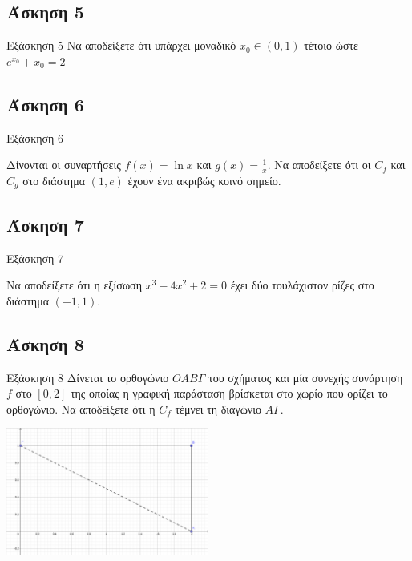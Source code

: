 \documentclass[greek]{beamer}
\begin{document}
\subsection{Άσκηση 5}
\begin{frame}[label=Άσκηση5]{Εξάσκηση 5}
    Να αποδείξετε ότι υπάρχει μοναδικό $x_0\in (0,1)$ τέτοιο ώστε $e^{x_0}+x_0=2$

\end{frame}

\subsection{Άσκηση 6}
\begin{frame}[label=Άσκηση6]{Εξάσκηση 6}

    Δίνονται οι συναρτήσεις $f(x)=\ln x$ και $g(x)=\frac{1}{x}$. Να αποδείξετε ότι οι $C_f$ και $C_g$ στο διάστημα $(1,e)$ έχουν ένα ακριβώς κοινό σημείο.

\end{frame}

\subsection{Άσκηση 7}
\begin{frame}[label=Άσκηση7]{Εξάσκηση 7}

    Να αποδείξετε ότι η εξίσωση $x^3-4x^2+2=0$ έχει δύο τουλάχιστον ρίζες στο διάστημα $(-1,1)$.

\end{frame}

\subsection{Άσκηση 8}
\begin{frame}[label=Άσκηση8]{Εξάσκηση 8}
    Δίνεται το ορθογώνιο $ΟΑΒΓ$ του σχήματος και μία συνεχής συνάρτηση $f$ στο $[0,2]$ της οποίας η γραφική παράσταση βρίσκεται στο χωρίο που ορίζει το ορθογώνιο. Να αποδείξετε ότι η $C_f$ τέμνει τη διαγώνιο $ΑΓ$.


    \centering
    \includegraphics[width=0.5\textwidth]{"images/Bolzano.png"}

\end{frame}
\end{document}

